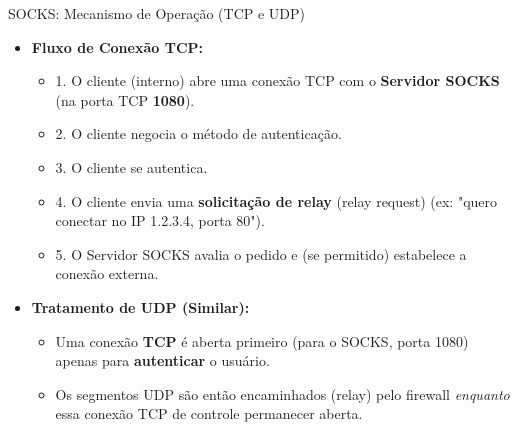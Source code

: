 \begin{frame}{SOCKS: Mecanismo de Operação (TCP e UDP)}
    \begin{itemize}
        \item \textbf{Fluxo de Conexão TCP:}
              \begin{itemize}
                  \item 1. O cliente (interno) abre uma conexão TCP com o \textbf{Servidor SOCKS} (na porta TCP \textbf{1080}).
                  \item 2. O cliente negocia o método de autenticação.
                  \item 3. O cliente se autentica.
                  \item 4. O cliente envia uma \textbf{solicitação de relay} (relay request) (ex: "quero conectar no IP 1.2.3.4, porta 80").
                  \item 5. O Servidor SOCKS avalia o pedido e (se permitido) estabelece a conexão externa.
              \end{itemize}

        \item \textbf{Tratamento de UDP (Similar):}
              \begin{itemize}
                  \item Uma conexão \textbf{TCP} é aberta primeiro (para o SOCKS, porta 1080) apenas para \textbf{autenticar} o usuário.
                  \item Os segmentos UDP são então encaminhados (relay) pelo firewall \textit{enquanto} essa conexão TCP de controle permanecer aberta.
              \end{itemize}
    \end{itemize}
\end{frame}

